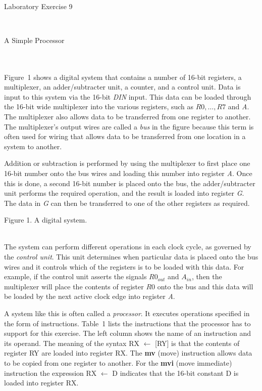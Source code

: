 \documentclass[epsfig,10pt,fullpage]{article}
\begin{document}
~\\
\centerline{\huge Laboratory Exercise 9}
~\\
\centerline{\large A Simple Processor}
~\\
~\\
\noindent
Figure~1 shows a digital system that contains a number of 16-bit registers, a multiplexer, an
adder/subtracter unit, a counter, and a control unit. Data is input to this system via the 16-bit
{\it DIN} input. This data can be loaded through the 16-bit wide multiplexer into the various
registers, such as $R0, \ldots, R7$ and {\it A}. The multiplexer also allows 
data to be transferred from one register to another. The multiplexer's output wires are called 
a {\it bus} in the figure because this term is often used for wiring that allows data to be 
transferred from one location in a system to another.

Addition or subtraction is performed by using the multiplexer to first place one
16-bit number onto the bus wires and loading this number into register {\it A}. Once this
is done, a second 16-bit number is placed onto the bus, the adder/subtracter unit
performs the required operation, and the result is loaded into register {\it G}. The
data in {\it G} can then be transferred to one of the other registers as required.

\begin{figure}[H]
\scriptsize
\centerline{
\hbox{}}
\end{figure}
\centerline{Figure 1.  A digital system.}
~\\

The system can perform different operations in each clock cycle, 
as governed by the {\it control unit}. This unit determines when particular data is 
placed onto the bus wires and it controls which of the registers is to be loaded with this data.
For example, if the control unit asserts the signals 
$R0_{out}$ and $A_{in}$, then the 
multiplexer will place the contents of register $R0$ onto the bus 
and this data will be loaded by the next active clock edge into register {\it A}.

A system like this is often called a {\it processor}. It executes operations specified in
the form of instructions. 
Table~1 lists the instructions that the processor has to support for this exercise.
The left column shows the name of an instruction and its operand. The meaning of the syntax 
RX $\leftarrow$ [RY] is that the contents of register RY are loaded into register RX. 
The {\bf mv} (move) instruction allows data to be copied from one register to another. 
For the {\bf mvi} (move immediate) instruction the expression RX $\leftarrow$ D indicates that the
16-bit constant D is loaded into register RX.
\end{document}
